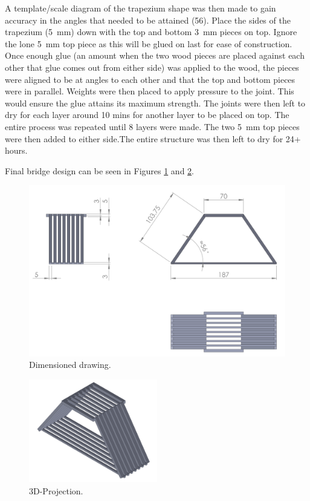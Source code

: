 \documentclass[12pt]{article}
\begin{document}
A template/scale diagram of the trapezium shape was then made to gain accuracy in the angles that needed to be attained (56\textdegree). Place the sides of the trapezium (5~mm) down with the top and bottom 3~mm pieces on top. Ignore the lone 5~mm top piece as this will be glued on last for ease of construction. Once enough glue (an amount when the two wood pieces are placed against each other that glue comes out from either side) was applied to the wood, the pieces were aligned to be at angles to each other and that the top and bottom pieces were in parallel. Weights were then placed to apply pressure to the joint. This would ensure the glue attains its maximum strength. The joints were then left to dry for each layer around 10 mins for another layer to be placed on top. The entire process was repeated until 8 layers were made.  The two 5~mm top pieces were then added to either side.The entire structure was then left to dry for 24+ hours.


		Final bridge design can be seen in Figures \ref{dim} and \ref{proj}.
		\begin{figure}[h!]
			\centering
			\includegraphics[width=\textwidth]{dim}
			\caption{Dimensioned drawing.}
			\label{dim}
		\end{figure}
		\begin{figure}[h!]
			\centering
			\includegraphics[width=0.5\textwidth]{proj}
			\caption{3D-Projection.}
			\label{proj}
		\end{figure}
		
\end{document}
